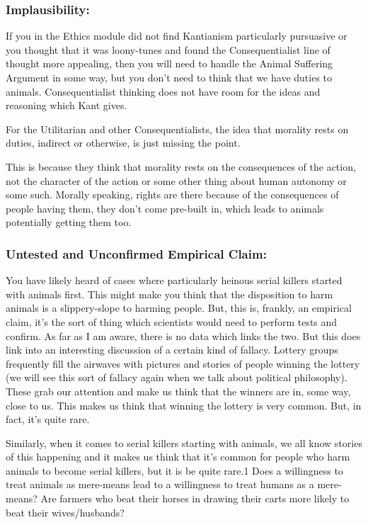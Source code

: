 \subsubsection{Implausibility:}

If you in the Ethics module did not find Kantianism particularly pursuasive or you thought that it was loony-tunes and found the Consequentialist line of thought more appealing, then you will need to handle the Animal Suffering Argument in some way, but you don't need to think that we have duties to animals. Consequentialist thinking does not have room for the ideas and reasoning which Kant gives.

For the Utilitarian and other Consequentialists, the idea that morality rests on duties, indirect or otherwise, is just missing the point. 

This is because they think that morality rests on the consequences of the action, not the character of the action or some other thing about human autonomy or some such. Morally speaking, rights are there because of the consequences of people having them, they don't come pre-built in, which leads to animals potentially getting them too. 
\subsubsection{Untested and Unconfirmed Empirical Claim:}

You have likely heard of cases where particularly heinous serial killers started with animals first. This might make you think that the disposition to harm animals is a slippery-slope to harming people. But, this is, frankly, an empirical claim, it's the sort of thing which scientists would need to perform tests and confirm. As far as I am aware, there is no data which links the two. But this does link into an interesting discussion of a certain kind of fallacy. Lottery groups frequently fill the airwaves with pictures and stories of people winning the lottery (we will see this sort of fallacy again when we talk about political philosophy). These grab our attention and make us think that the winners are in, some way, close to us. This makes us think that winning the lottery is very common. But, in fact, it's quite rare.

Similarly, when it comes to serial killers starting with animals, we all know stories of this happening and it makes us think that it's common for people who harm animals to become serial killers, but it is be quite rare.1 Does a willingness to treat animals as mere-means lead to a willingness to treat humans as a mere-means? Are farmers who beat their horses in drawing their carts more likely to beat their wives/husbands?


